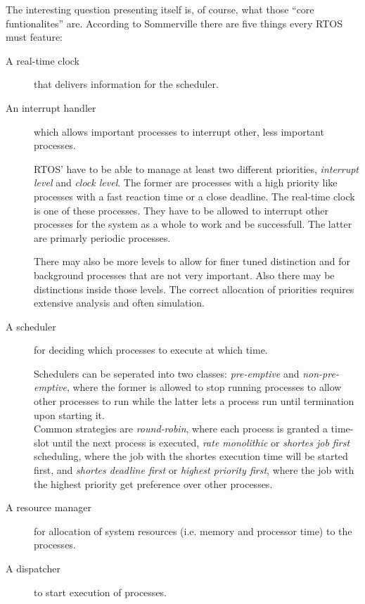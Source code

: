 \documentclass[10pt,a4paper,titlepage,draft]{article} %
\begin{document}
The interesting question presenting itself is, of course, what those ``core funtionalites'' are.
According to Sommerville there are five things every RTOS must feature:
\begin{description}
	\item[A real-time clock] that delivers information for the scheduler.
	\item[An interrupt handler] which allows important processes to interrupt other, less important processes.

	RTOS' have to be able to manage at least two different priorities, \emph{interrupt level} and \emph{clock level}.
	The former are processes with a high priority like processes with a fast reaction time or a close deadline.
	The real-time clock is one of these processes.
	They have to be allowed to interrupt other processes for the system as a whole to work and be successfull.
	The latter are primarly periodic processes.

	There may also be more levels to allow for finer tuned distinction and for background processes that are not very important. Also there may be distinctions inside those levels. The correct allocation of priorities requires extensive analysis and often simulation.
	\item[A scheduler] for deciding which processes to execute at which time.

	Schedulers can be seperated into two classes: \emph{pre-emptive} and \emph{non-pre-emptive}, where the former is allowed to stop running processes to allow other processes to run while the latter lets a process run until termination upon starting it.\\
	Common strategies are \emph{round-robin}, where each process is granted a time-slot until the next process is executed, \emph{rate monolithic} or \emph{shortes job first} scheduling, where the job with the shortes execution time will be started first, and \emph{shortes deadline first} or \emph{highest priority first}, where the job with the highest priority get preference over other processes.
	\item[A resource manager] for allocation of system resources (i.e. memory and processor time) to the processes.
	\item[A dispatcher] to start execution of processes.
\end{description}

\end{document}
